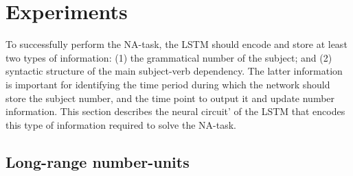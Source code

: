 \section{Experiments}\label{sec:results}
To successfully perform the NA-task, the LSTM should encode and store at least two types of information: (1) the grammatical number of the subject; and (2) syntactic structure of the main subject-verb dependency. The latter information is important for identifying the time period during which the network should store the subject number,  and the time point to output it and update number information. This section describes the neural circuit' of the LSTM that encodes this type of information required to solve the NA-task.

\subsection{Long-range number-units}\label{subsec:ablation}
